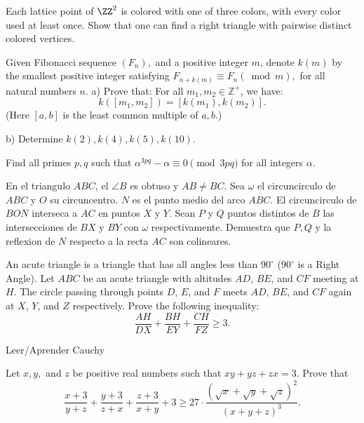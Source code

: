 \documentclass[11pt]{scrartcl}
\begin{document}
\begin{problem}
  Each lattice point of $\ZZ^2$ is colored with one of three colors,
  with every color used at least once.
  Show that one can find a right triangle with pairwise distinct colored vertices.
\end{problem}
\begin{problem}
Given Fibonacci sequence $(F_n),$ and a positive integer $m$, denote $k(m)$ by the smallest positive integer satisfying $F_{n+k(m)}\equiv F_n(\bmod m),$ for all natural numbers $n$.
a) Prove that: For all $m_1,m_2\in \mathbb{Z^+}$, we have:$$k([m_1,m_2])=[k(m_1),k(m_2)].$$(Here $[a,b]$ is the least common multiple of $a,b.$)

b) Determine $k(2),k(4),k(5),k(10).$
\end{problem}
\begin{problem}
Find all primes $ p,q $ such that $ \alpha^{3pq} -\alpha \equiv 0 \pmod {3pq} $ for all integers $ \alpha $.
\end{problem}
\begin{problem}
En el triangulo $ABC$, el $\angle B$ es obtuso y $AB \neq BC$. Sea $\omega$ el circuncirculo de $ABC$ y $O$ su circuncentro. $N$ es el punto medio del arco $ABC$. El circuncirculo de $BON$ interseca a $AC$ en puntos $X$ y $Y$. Sean $P$ y $Q$ puntos distintos de $B$ las intersecciones de $BX$ y $BY$ con $\omega$ respectivamente. Demuestra que $P,Q$ y la reflexion de $N$ respecto a la recta $AC$ son colineares.  
\end{problem}
\begin{problem}[Canada 2023/3]
    An acute triangle is a triangle that has all angles less than $90^{\circ}$ ($90^{\circ}$ is a Right Angle). Let $ABC$ be an acute triangle with altitudes $AD$, $BE$, and $CF$ meeting at $H$. The circle passing through points $D$, $E$, and $F$ meets $AD$, $BE$, and $CF$ again at $X$, $Y$, and $Z$ respectively. Prove the following inequality:$$\frac{AH}{DX}+\frac{BH}{EY}+\frac{CH}{FZ} \geq 3.$$
\end{problem}
\begin{problem}
Leer/Aprender Cauchy
\end{problem}
\begin{problem}
Let $x, y,$ and $z$ be positive real numbers such that $xy + yz + zx = 3$. Prove that
$$\frac{x + 3}{y + z} + \frac{y + 3}{z + x} + \frac{z + 3}{x + y} + 3 \ge 27 \cdot \frac{(\sqrt{x} + \sqrt{y} + \sqrt{z})^2}{(x + y + z)^3}.$$
\end{problem}
\end{document}
